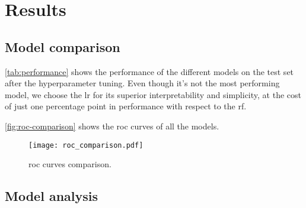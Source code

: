 \section{Results}

\subsection{Model comparison}

\autoref{tab:performance} shows the performance of the different models on the test set after the hyperparameter tuning.
Even though it's not the most performing model, we choose the \gls{lr} for its superior interpretability and simplicity, at the cost of just one percentage point in performance with respect to the \gls{rf}.

\autoref{fig:roc-comparison} shows the \gls{roc} curves of all the models.



\begin{figure}[htpb]
    \centering
    \texttt{[image: roc\_comparison.pdf]}
    \caption{\gls{roc} curves comparison.}
    \label{fig:roc-comparison}
\end{figure}




\subsection{Model analysis}

